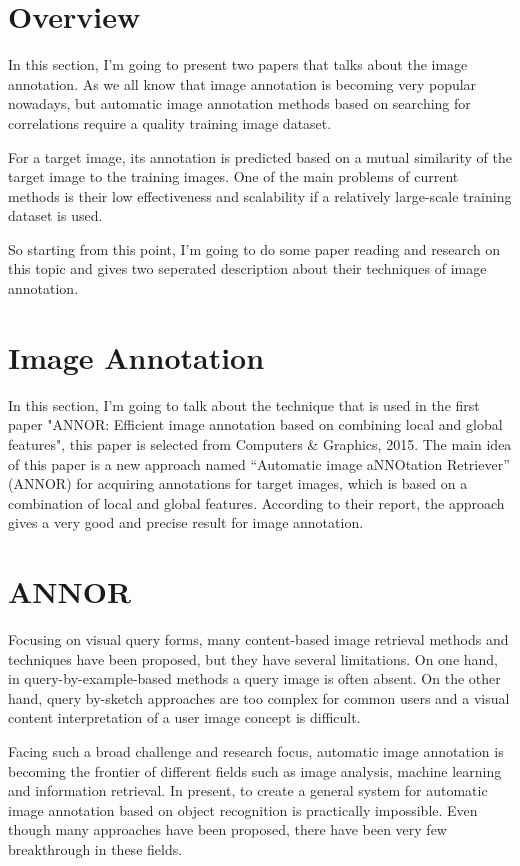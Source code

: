 \documentclass[pdftex,12pt,a4paper]{article}
\begin{document}


\section{Overview}

In this section, I'm going to present two papers that talks about the image annotation. As we
all know that image annotation is becoming very popular nowadays, but automatic image annotation methods based on searching for correlations require a quality training image dataset. 

For a target image, its annotation is predicted based on a mutual similarity of the target image to the training images. One of the main problems of current methods is their low effectiveness and scalability if a relatively large-scale training dataset is used.

So starting from this point, I'm going to do some paper reading and research on this topic and gives two seperated
description about their techniques of image annotation.

\section{Image Annotation}
In this section, I'm going to talk about the technique that is used in the first paper "ANNOR: Efficient image annotation based on combining local and global features", this paper is selected from Computers \& Graphics, 2015. The main idea of this paper is a new approach named
“Automatic image aNNOtation Retriever” (ANNOR) for acquiring annotations for target images, which is
based on a combination of local and global features. According to their report, the approach gives a very good and precise result for image annotation.

\section{ANNOR}
Focusing on visual query forms, many content-based image retrieval methods and techniques have been proposed,
but they have several limitations. On one hand, in query-by-example-based
methods a query image is often absent. On the other hand, query by-sketch
approaches are too complex for common users and
a visual content interpretation of a user image concept is difficult.

Facing such a broad challenge and research focus, automatic image annotation is becoming the frontier of 
different fields such as image analysis, machine learning and information retrieval. In
present, to create a general system for automatic image annotation
based on object recognition is practically impossible. Even though many approaches have been proposed, there
have been very few breakthrough in these fields.
\end{document}
